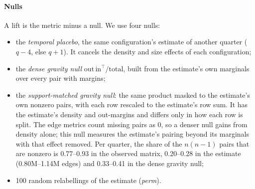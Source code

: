 \documentclass[preprint,3p,twocolumn]{elsarticle}
\begin{document}
\paragraph{Nulls} A lift is the metric minus a null. We use four nulls:
\begin{itemize}
\item the \emph{temporal placebo}, the same configuration's estimate of another quarter ($q-4$, else $q+1$). It cancels the density and size effects of each configuration;
\item the \emph{dense gravity null} $\mathrm{out}\,\mathrm{in}^\top/\text{total}$, built from the estimate's own marginals over every pair with margins;
\item the \emph{support-matched gravity null}: the same product masked to the estimate's own nonzero pairs, with each row rescaled to the estimate's row sum. It has the estimate's density and out-margins and differs only in how each row is split. The edge metrics count missing pairs as 0, so a denser null gains from density alone; this null measures the estimate's pairing beyond its marginals with that effect removed. Per quarter, the share of the $n(n-1)$ pairs that are nonzero is 0.77--0.93 in the observed matrix, 0.20--0.28 in the estimate (0.80M--1.14M edges) and 0.33--0.41 in the dense gravity null;
\item 100 random relabellings of the estimate (\emph{perm}).
\end{itemize}
\end{document}
